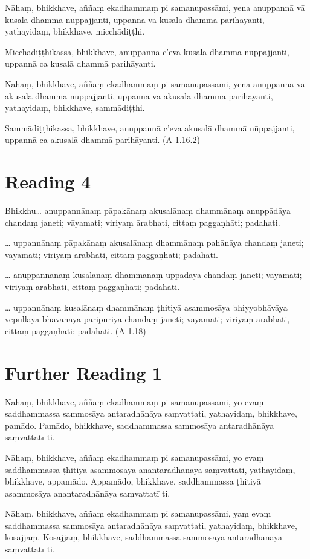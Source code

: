 Nāhaṃ, bhikkhave, aññaṃ ekadhammaṃ pi samanupassāmi, yena anuppannā vā kusalā dhammā nūppajjanti, uppannā vā kusalā dhammā parihāyanti, yathayidaṃ, bhikkhave, micchādiṭṭhi.

Micchādiṭṭhikassa, bhikkhave, anuppannā c’eva kusalā dhammā nūppajjanti, uppannā ca kusalā dhammā parihāyanti.

Nāhaṃ, bhikkhave, aññaṃ ekadhammaṃ pi samanupassāmi, yena anuppannā vā akusalā dhammā nūppajjanti, uppannā vā akusalā dhammā parihāyanti, yathayidaṃ, bhikkhave, sammādiṭṭhi.

Sammādiṭṭhikassa, bhikkhave, anuppannā c’eva akusalā dhammā nūppajjanti, uppannā ca akusalā dhammā parihāyanti. (A 1.16.2)

\section*{Reading 4}

Bhikkhu… anuppannānaṃ pāpakānaṃ akusalānaṃ dhammānaṃ anuppādāya chandaṃ janeti; vāyamati; viriyaṃ ārabhati, cittaṃ paggaṇhāti; padahati.

… uppannānaṃ pāpakānaṃ akusalānaṃ dhammānaṃ pahānāya chandaṃ janeti; vāyamati; viriyaṃ ārabhati, cittaṃ paggaṇhāti; padahati.

… anuppannānaṃ kusalānaṃ dhammānaṃ uppādāya chandaṃ janeti; vāyamati; viriyaṃ ārabhati, cittaṃ paggaṇhāti; padahati.

… uppannānaṃ kusalānaṃ dhammānaṃ ṭhitiyā asammosāya bhiyyobhāvāya vepullāya bhāvanāya pāripūriyā chandaṃ janeti; vāyamati; viriyaṃ ārabhati, cittaṃ paggaṇhāti; padahati. (A 1.18)

\section*{Further Reading 1}

Nāhaṃ, bhikkhave, aññaṃ ekadhammaṃ pi samanupassāmi, yo evaṃ saddhammassa sammosāya antaradhānāya saṃvattati, yathayidaṃ, bhikkhave, pamādo. Pamādo, bhikkhave, saddhammassa sammosāya antaradhānāya saṃvattatī ti.

Nāhaṃ, bhikkhave, aññaṃ ekadhammaṃ pi samanupassāmi, yo evaṃ saddhammassa ṭhitiyā asammosāya anantaradhānāya saṃvattati, yathayidaṃ, bhikkhave, appamādo. Appamādo, bhikkhave, saddhammassa ṭhitiyā asammosāya anantaradhānāya saṃvattatī ti.

Nāhaṃ, bhikkhave, aññaṃ ekadhammaṃ pi samanupassāmi, yaṃ evaṃ saddhammassa sammosāya antaradhānāya saṃvattati, yathayidaṃ, bhikkhave, kosajjaṃ. Kosajjaṃ, bhikkhave, saddhammassa sammosāya antaradhānāya saṃvattatī ti.

